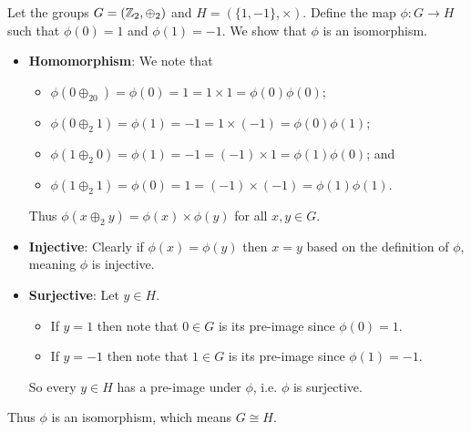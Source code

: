 \begin{example}
    Let the groups $G = (\mathbb{Z}_2, \oplus_2)$ and $H = (\{1, -1\}, \times)$. Define the map $\phi: G \to H$ such that $\phi(0) = 1$ and $\phi(1) = -1$. We show that $\phi$ is an isomorphism.

    \begin{itemize}
        \item \textbf{Homomorphism}: We note that
        \begin{itemize}
            \item $\phi(0\oplus_20) = \phi(0) = 1 = 1 \times 1 = \phi(0)\phi(0)$;
            \item $\phi(0 \oplus_2 1) = \phi(1) = -1 = 1 \times (-1) = \phi(0)\phi(1)$;
            \item $\phi(1 \oplus_2 0) = \phi(1) = -1 = (-1) \times 1 = \phi(1)\phi(0)$; and
            \item $\phi(1 \oplus_2 1) = \phi(0) = 1 = (-1) \times (-1) = \phi(1)\phi(1)$.
        \end{itemize}
        Thus $\phi(x\oplus_2y) = \phi(x)\times\phi(y)$ for all $x, y \in G$.

        \item \textbf{Injective}: Clearly if $\phi(x) = \phi(y)$ then $x = y$ based on the definition of $\phi$, meaning $\phi$ is injective.

        \item \textbf{Surjective}: Let $y \in H$.
        \begin{itemize}
            \item If $y = 1$ then note that $0 \in G$ is its pre-image since $\phi(0) = 1$.
            \item If $y = -1$ then note that $1 \in G$ is its pre-image since $\phi(1) = -1$.
        \end{itemize}
        So every $y \in H$ has a pre-image under $\phi$, i.e. $\phi$ is surjective.
    \end{itemize}
    Thus $\phi$ is an isomorphism, which means $G \cong H$.
\end{example}

